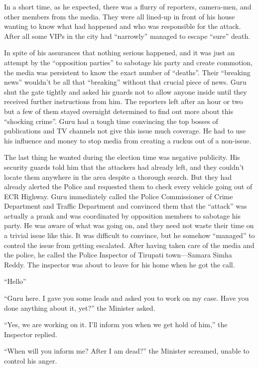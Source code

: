 In a short time, as he expected, there was a flurry of reporters, camera-men,
and other members from the media. They were all lined-up in front of his house
wanting to know what had happened and who was responsible for the attack. After
all some VIPs in the city had “narrowly” managed to escape “sure” death.

In spite of his assurances that nothing serious happened, and it was just an
attempt by the “opposition parties” to sabotage his party and create commotion,
the media was persistent to know the exact number of “deaths”. Their “breaking
news” wouldn't be all that “breaking” without that crucial piece of news. Guru
shut the gate tightly and asked his guards not to allow anyone inside until they
received further instructions from him. The reporters left after an hour or two
but a few of them stayed overnight determined to find out more about this
“shocking crime”. Guru had a tough time convincing the top bosses of
publications and TV channels not give this issue much coverage. He had to use
his influence and money to stop media from creating a ruckus out of a non-issue.

The last thing he wanted during the election time was negative publicity. His
security guards told him that the attackers had already left, and they couldn't
locate them anywhere in the area despite a thorough search. But they had already
alerted the Police and requested them to check every vehicle going out of ECR
Highway. Guru immediately called the Police Commissioner of Crime Department and
Traffic Department and convinced them that the “attack” was actually a prank and
was coordinated by opposition members to sabotage his party. He was aware of
what was going on, and they need not waste their time on a trivial issue like
this. It was difficult to convince, but he somehow “managed” to control the
issue from getting escalated.
After having taken care of the media and the police, he called the Police
Inspector of Tirupati town—Samara Simha Reddy. The inspector was about to
leave for his home when he got the call.

“Hello”

“Guru here. I gave you some leads and asked you to work on my case. Have you
done anything about it, yet?” the Minister asked.

“Yes, we are working on it. I'll inform you when we get hold of him,” the
Inspector replied.

“When will you inform me? After I am dead?” the Minister screamed, unable to
control his anger.

